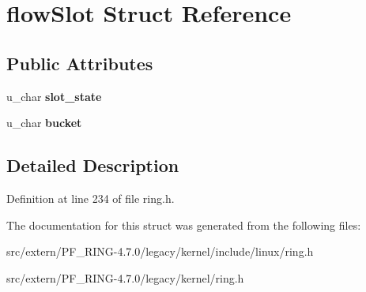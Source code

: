 \hypertarget{structflow_slot}{
\section{flowSlot Struct Reference}
\label{structflow_slot}
}
\subsection*{Public Attributes}
\begin{DoxyCompactItemize}
\item 
\hypertarget{structflow_slot_af9764c4a308bb4986a1892bd0b3537c4}{
u\_\-char {\bfseries slot\_\-state}}
\label{structflow_slot_af9764c4a308bb4986a1892bd0b3537c4}

\item 
\hypertarget{structflow_slot_a5f8c2dc9ceb37c1226a1a1a6b8b806cc}{
u\_\-char {\bfseries bucket}}
\label{structflow_slot_a5f8c2dc9ceb37c1226a1a1a6b8b806cc}

\end{DoxyCompactItemize}


\subsection{Detailed Description}


Definition at line 234 of file ring.h.



The documentation for this struct was generated from the following files:\begin{DoxyCompactItemize}
\item 
src/extern/PF\_\-RING-\/4.7.0/legacy/kernel/include/linux/ring.h\item 
src/extern/PF\_\-RING-\/4.7.0/legacy/kernel/ring.h\end{DoxyCompactItemize}

